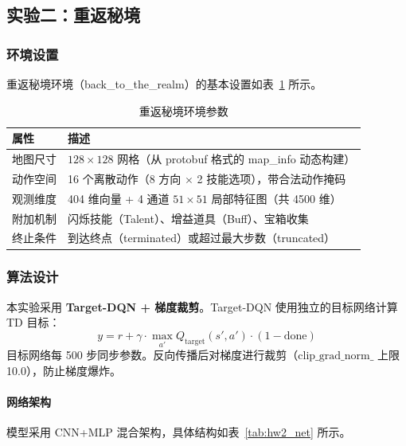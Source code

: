 \documentclass[12pt,a4paper]{article}
\begin{document}
\subsection{实验二：重返秘境}

\subsubsection{环境设置}

重返秘境环境（back\_to\_the\_realm）的基本设置如表~\ref{tab:hw2_env} 所示。

\begin{table}[htbp]
\centering
\caption{重返秘境环境参数}\label{tab:hw2_env}
\begin{tabularx}{\textwidth}{lX}
\toprule
\textbf{属性} & \textbf{描述} \\
\midrule
地图尺寸   & $128\times128$ 网格（从 protobuf 格式的 map\_info 动态构建） \\
动作空间   & 16 个离散动作（8 方向 $\times$ 2 技能选项），带合法动作掩码 \\
观测维度   & 404 维向量 + 4 通道 $51\times51$ 局部特征图（共 4500 维） \\
附加机制   & 闪烁技能（Talent）、增益道具（Buff）、宝箱收集 \\
终止条件   & 到达终点（terminated）或超过最大步数（truncated） \\
\bottomrule
\end{tabularx}
\end{table}

\subsubsection{算法设计}

本实验采用 \textbf{Target-DQN + 梯度裁剪}。Target-DQN 使用独立的目标网络计算 TD 目标：
\begin{equation}
y = r + \gamma \cdot \max_{a'} Q_{\text{target}}(s', a') \cdot (1 - \text{done})
\end{equation}
目标网络每 500 步同步参数。反向传播后对梯度进行裁剪（$\text{clip\_grad\_norm\_}$ 上限 10.0），防止梯度爆炸。

\paragraph{网络架构}
模型采用 CNN+MLP 混合架构，具体结构如表~\ref{tab:hw2_net} 所示。
\end{document}
